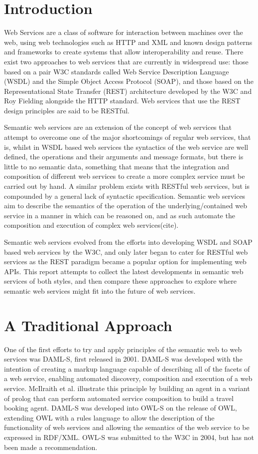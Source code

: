 \section{Introduction}

Web Services are a class of software for interaction between machines over the
web, using web technologies such as HTTP and XML and known design patterns and
frameworks to create systems that allow interoperability and reuse. There exist
two approaches to web services that are currently in widespread use: those based
on a pair W3C standards called Web Service Description Language (WSDL) and the
Simple Object Access Protocol (SOAP), and those based on the 
Representational State Transfer (REST) architecture developed by the W3C and Roy
Fielding alongside the HTTP standard. Web services that use the REST design
principles are said to be RESTful.

Semantic web services are an extension of the concept of web services that
attempt to overcome one of the major shortcomings of regular web services, that
is, whilst in WSDL based web services the syntactics of the web service are well
defined, the operations and their arguments and message formats, but there is
little to no semantic data, something that means that the integration and
composition of different web services to create a more complex service must be
carried out by hand. A similar problem exists with RESTful web services, but is
compounded by a general lack of syntactic specification. Semantic web services
aim to describe the semantics of the operation of the underlying/contained  web
service in a manner in which can be reasoned on, and as such automate the
composition and execution of complex web services(cite).

Semantic web services evolved from the efforts into developing WSDL and SOAP
based web services by the W3C, and only later began to cater for RESTful web
services as the REST paradigm became a popular option for implementing web APIs.
This report attempts to collect the latest developments in semantic web services
of both styles, and then compare these approaches to explore where semantic web
services might fit into the future of web services.

\section{A Traditional Approach}

One of the first efforts to try and apply principles of the semantic web to web
services was DAML-S, first released in 2001. DAML-S was developed with the
intention of creating a markup language capable of describing all of the facets
of a web service, enabling automated discovery, composition and execution of a
web service. McIlraith et al. illustrate this principle by building an agent in
a variant of prolog that can perform automated service composition to build a
travel booking agent\cite{mcilraith_semantic_2001}. DAML-S was developed into
OWL-S on the release of OWL, extending OWL with a rules language to allow
the description of the functionality of web services and allowing the semantics
of the web service to be expressed in RDF/XML. OWL-S was submitted to the W3C in
2004, but has not been made a recommendation.

